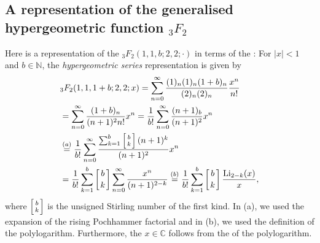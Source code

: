 \documentclass{article}
\begin{document}






\subsection{A representation of the generalised hypergeometric function $_3F_2$}


Here is a representation of the  $_3F_2(1,1,b;2,2;\cdot)$ in terms of the : For  $|x|<1$ and $b\in\mathbb{N}$, the \textit{hypergeometric series} representation is given by
                 \begin{align*}
                   &  _3F_2(1,1,1+b;2,2;x)= \sum^{\infty}_{n=0}\frac{(1)_n(1)_n(1+b)_n}{(2)_n(2)_n} \frac{x^n}{n!} \nonumber\\
                   &=\sum^{\infty}_{n=0}\frac{(1+b)_n}{(n+1)^2n!}x^n = \frac{1}{b!}\sum^{\infty}_{n=0} \frac{(n+1)_{b}}{(n+1)^2}x^n \nonumber \\
                   &\overset{(a)}{=} \frac{1}{b!} \sum^{\infty}_{n=0} \frac{\sum^{b}_{k=1}\left[ b \atop k \right](n+1)^k}{(n+1)^2} x^n\nonumber \\
                   &= \frac{1}{b!} \sum^{b}_{k=1}\left[ b \atop k \right] \sum^{\infty}_{n=0}  \frac{x^n}{(n+1)^{2-k}} \overset{(b)}{=} \frac{1}{b!}\sum^{b}_{k=1} \left[ b \atop k \right]\frac{\text{Li}_{2-k}(x)}{x}, \label{eq:pollog}
                 \end{align*}
                 where $\left[ b \atop k \right]$ is the unsigned Stirling number of the first kind. In (a), we used the expansion of the rising Pochhammer factorial and in (b), we used the definition of the polylogarithm. Furthermore, the $x \in \mathbb{C}$ follows from the  of the polylogarithm.
\end{document}
